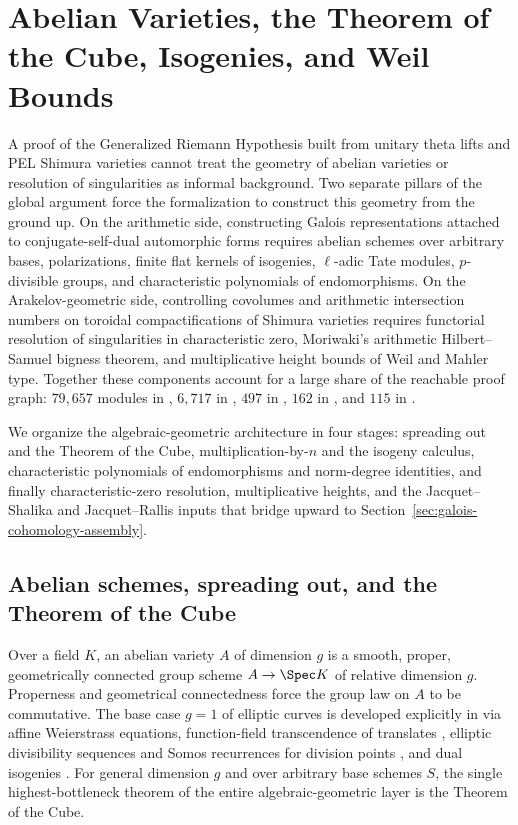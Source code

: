 \section{Abelian Varieties, the Theorem of the Cube, Isogenies, and Weil Bounds}
\label{sec:abelian-varieties-weil}

A proof of the Generalized Riemann Hypothesis built from unitary theta lifts and
PEL Shimura varieties cannot treat the geometry of abelian varieties or
resolution of singularities as informal background. Two separate pillars of the
global argument force the formalization to construct this geometry from the
ground up. On the arithmetic side, constructing Galois representations attached
to conjugate-self-dual automorphic forms requires abelian schemes over arbitrary
bases, polarizations, finite flat kernels of isogenies, $\ell$-adic Tate
modules, $p$-divisible groups, and characteristic polynomials of endomorphisms.
On the Arakelov-geometric side, controlling covolumes and arithmetic
intersection numbers on toroidal compactifications of Shimura varieties requires
functorial resolution of singularities in characteristic zero, Moriwaki's
arithmetic Hilbert--Samuel bigness theorem, and multiplicative height bounds of
Weil and Mahler type. Together these components account for a large share of the
reachable proof graph: $79{,}657$ modules in
, $6{,}717$ in
, $497$ in
, $162$ in
, and $115$ in
.

We organize the algebraic-geometric architecture in four stages: spreading out
and the Theorem of the Cube, multiplication-by-$n$ and the isogeny calculus,
characteristic polynomials of endomorphisms and norm-degree identities, and
finally characteristic-zero resolution, multiplicative heights, and the
Jacquet--Shalika and Jacquet--Rallis inputs that bridge upward to
Section~\ref{sec:galois-cohomology-assembly}.

\subsection{Abelian schemes, spreading out, and the Theorem of the Cube}

Over a field $K$, an abelian variety $A$ of dimension $g$
 is a smooth, proper, geometrically connected
group scheme $A \to \Spec K$ of relative dimension $g$. Properness and
geometrical connectedness force the group law on $A$ to be commutative. The
base case $g = 1$ of elliptic curves is developed explicitly in
 via affine Weierstrass equations,
function-field transcendence of translates
,
elliptic divisibility sequences and Somos recurrences for division points
, and dual isogenies
. For general dimension $g$
and over arbitrary base schemes $S$, the single highest-bottleneck theorem of
the entire algebraic-geometric layer is the Theorem of the Cube.

